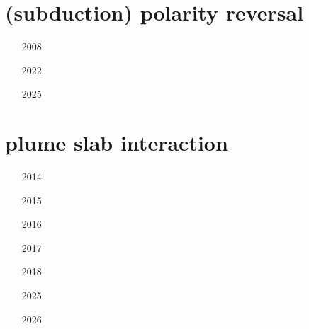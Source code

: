 \section{(subduction) polarity reversal}

\begin{small}
\begin{itemize}
\item[2008] 
\item[2022] 
\item[2025] \\ 
\end{itemize}
\end{small}

\section{plume slab interaction}

\begin{small}
\begin{itemize}
\item[2014]
\item[2015]
 \\
\item[2016] 
\item[2017]
\item[2018]
\item[2025]
\item[2026]
\end{itemize}
\end{small}



